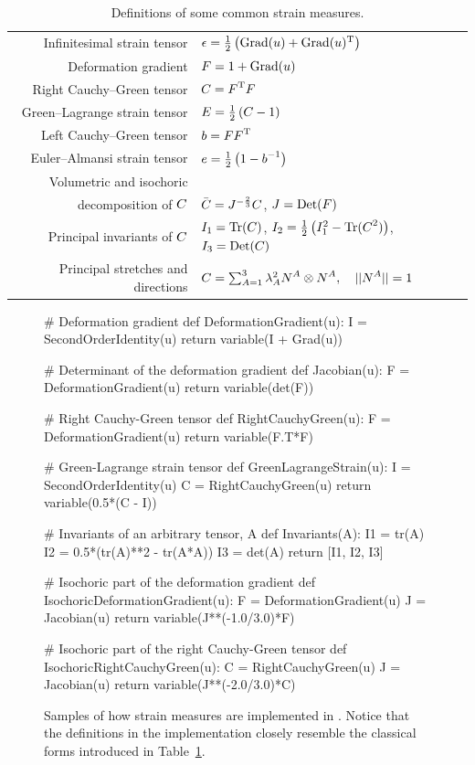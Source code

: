 \begin{table}
\begin{tabular}{rl}
Infinitesimal strain tensor & $\mbox{$\epsilon$} = \frac{1}{2}
  \left(\mathrm{Grad}(\mbox{$ u$}) + \mathrm{Grad}(\mbox{$ u$})^{\mathrm{T}}\right)$
\\
Deformation gradient &  $\mbox{$ F$} = {1} + \mathrm{Grad}(\mbox{$ u$})$
\\
Right Cauchy--Green tensor & $\mbox{$ C$} = \mbox{$ F$}^{\mathrm{T}} \mbox{$ F$}$
\\
Green--Lagrange strain tensor & $\mbox{$ E$} = \frac{1}{2} \left(\mbox{$ C$} -
  {1}\right)$
\\
Left Cauchy--Green tensor & $\mbox{$ b$} = \mbox{$ F$} \mbox{$ F$}^{\mathrm{T}}$
\\
Euler--Almansi strain tensor &  $\mbox{$ e$} = \frac{1}{2} \left({1} -
    \mbox{$ b$}^{-1}\right)$\\
Volumetric and isochoric\\ decomposition of $\mbox{$ C$}$ &  $\bar{\mbox{$ C$}} =
  J^{-\frac{2}{3}} \mbox{$ C$}$, \quad $J = \mathrm{Det}(\mbox{$ F$})$
\\
Principal invariants of $\mbox{$ C$}$ &  $I_{1} =
  \mathrm{Tr}(\mbox{$ C$})$, $I_{2} = \frac{1}{2}\left(I_{1}^{2} -
    \mathrm{Tr}(\mbox{$ C$}^{2})\right)$, $I_{3} = \mathrm{Det}(\mbox{$ C$})$
\\
Principal stretches and directions &  $\mbox{$ C$} = \sum_{A=1}^{3}
\lambda_{A}^{2} \mbox{$ N$}^{A} \otimes \mbox{$ N$}^{A}, \quad ||\mbox{$ N$}^{A}|| = 1$
\end{tabular}
\caption{Definitions of some common strain measures.}
\label{tab:narayanan:straindefs}
\end{table}

\begin{figure}
\bwfig
\begin{python}
# Deformation gradient
def DeformationGradient(u):
    I = SecondOrderIdentity(u)
    return variable(I + Grad(u))

# Determinant of the deformation gradient
def Jacobian(u):
    F = DeformationGradient(u)
    return variable(det(F))

# Right Cauchy-Green tensor
def RightCauchyGreen(u):
    F = DeformationGradient(u)
    return variable(F.T*F)

# Green-Lagrange strain tensor
def GreenLagrangeStrain(u):
    I = SecondOrderIdentity(u)
    C = RightCauchyGreen(u)
    return variable(0.5*(C - I))

# Invariants of an arbitrary tensor, A
def Invariants(A):
    I1 = tr(A)
    I2 = 0.5*(tr(A)**2 - tr(A*A))
    I3 = det(A)
    return [I1, I2, I3]

# Isochoric part of the deformation gradient
def IsochoricDeformationGradient(u):
    F = DeformationGradient(u)
    J = Jacobian(u)
    return variable(J**(-1.0/3.0)*F)

# Isochoric part of the right Cauchy-Green tensor
def IsochoricRightCauchyGreen(u):
    C = RightCauchyGreen(u)
    J = Jacobian(u)
    return variable(J**(-2.0/3.0)*C)
\end{python}
\caption{Samples of how strain measures are implemented in
  \twist. Notice that the definitions in the implementation closely
  resemble the classical forms introduced in
  Table~\ref{tab:narayanan:straindefs}.}
\label{code:narayanan:kinematics.py}
\end{figure}

